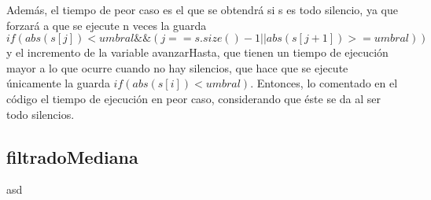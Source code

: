 \documentclass{article}
\begin{document}
Además, el tiempo de peor caso es el que se obtendrá si s es todo silencio, ya que forzará a que se ejecute n
veces la guarda $if(abs(s[j]) < umbral \&\& (j == s.size()-1 || abs(s[j+1]) >= umbral))$ y el incremento de
la variable avanzarHasta, que tienen un tiempo de ejecución mayor a lo que ocurre cuando no hay silencios,
que hace que se ejecute únicamente la guarda $if(abs(s[i]) < umbral)$. Entonces, lo comentado en el código el tiempo de
ejecución en peor caso, considerando que éste se da al ser todo silencios.


\newpage
\subsection{filtradoMediana}
asd
\end{document}
